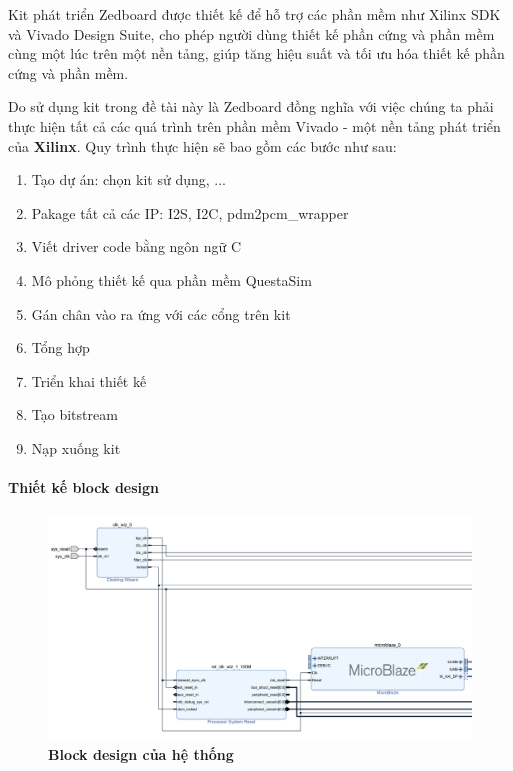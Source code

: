 Kit phát triển Zedboard được thiết kế để hỗ trợ các phần mềm như Xilinx SDK và Vivado Design Suite, cho phép người dùng thiết kế phần cứng và phần mềm cùng một lúc trên một nền tảng,  giúp tăng hiệu suất và tối ưu hóa thiết kế phần cứng và phần mềm.

Do sử dụng kit trong đề tài này là Zedboard đồng nghĩa với việc chúng ta phải thực hiện tất cả các quá trình trên phần mềm Vivado - một nền tảng phát triển của \textbf{Xilinx}.
Quy trình thực hiện sẽ bao gồm các bước như sau:
\begin{enumerate}
    \item Tạo dự án: chọn kit sử dụng, ...
    \item Pakage tất cả các IP: I2S, I2C, pdm2pcm\_wrapper
    \item Viết driver code bằng ngôn ngữ C
    \item Mô phỏng thiết kế qua phần mềm QuestaSim
    \item Gán chân vào ra ứng với các cổng trên kit
    \item Tổng hợp
    \item Triển khai thiết kế
    \item Tạo bitstream
    \item Nạp xuống kit
\end{enumerate}



\paragraph{Thiết kế block design}

\begin{figure}[H]
    \centering
    \includegraphics[width=15cm]{Images/Chuong5/fpga/block_design_1.png}
    \caption[Block design của hệ thống]{\bfseries \fontsize{12pt}{0pt}\selectfont Block design của hệ thống}
    \label{bd1}
\end{figure}

